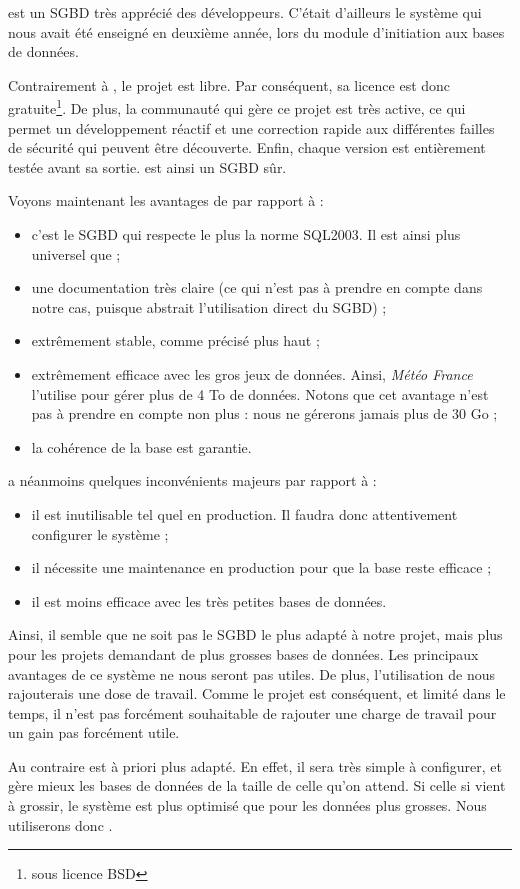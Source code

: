 \psql est un SGBD très apprécié des développeurs. C'était d'ailleurs le système qui nous avait été enseigné en deuxième année, lors du module d'initiation aux bases de données. 

Contrairement à \mysql, le projet est libre. Par conséquent, sa licence est donc gratuite\footnote{sous licence BSD}. De plus, la communauté qui gère ce projet est très active, ce qui permet un développement réactif et une correction rapide aux différentes failles de sécurité qui peuvent être découverte. 
Enfin, chaque version est entièrement testée avant sa sortie. \psql est ainsi un SGBD sûr. 

Voyons maintenant les avantages de \psql par rapport à \mdb : 

\begin{itemize}
\item c'est le SGBD qui respecte le plus la norme SQL2003. Il est ainsi plus universel que \mdb ;
\item une documentation très claire (ce qui n'est pas à prendre en compte dans notre cas, puisque \symfony abstrait l'utilisation direct du SGBD) ;
\item extrêmement stable, comme précisé plus haut ;
\item extrêmement efficace avec les gros jeux de données. Ainsi, \textit{Météo France} l'utilise pour gérer plus de 4 To de données. Notons que cet avantage n'est pas à prendre en compte non plus : nous ne gérerons jamais plus de 30 Go ;
\item la cohérence de la base est garantie.
\end{itemize}

\psql a néanmoins quelques inconvénients majeurs  par rapport à \mdb : 

\begin{itemize}
\item il est inutilisable tel quel en production. Il faudra donc attentivement configurer le système ;
\item il nécessite une maintenance en production pour que la base reste efficace ;
\item il est moins efficace avec les très petites bases de données.  
\end{itemize}

\bigbreak
Ainsi, il semble que \psql ne soit pas le SGBD le plus adapté à notre projet, mais plus pour les projets demandant de plus grosses bases de données. 
Les principaux avantages de ce système ne nous seront pas utiles. De plus, l'utilisation de \psql nous rajouterais une dose de travail. Comme le projet est conséquent, et limité dans le temps, il n'est pas forcément souhaitable de rajouter une charge de travail pour un gain pas forcément utile. 

Au contraire \mdb est à priori plus adapté. En effet, il sera très simple à configurer, et gère mieux les bases de données de la taille de celle qu'on attend. Si celle si vient à grossir, le système est plus optimisé que \mysql pour les données plus grosses. Nous utiliserons donc \mdb. 
